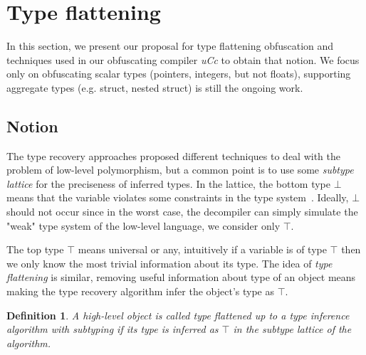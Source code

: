 \documentclass[compsoc,conference,a4paper,10pt,times]{IEEEtran}
\newtheorem{definition}{Definition}
\begin{document}
\section{Type flattening}
\noindent
In this section, we present our proposal for type flattening obfuscation and techniques used in
our obfuscating compiler \emph{uCc} to obtain that notion. We
focus only on obfuscating scalar types (pointers, integers, but not floats), supporting aggregate types
(e.g. struct, nested struct) is still the ongoing work.


\subsection{Notion}
\noindent
The type recovery approaches proposed different techniques to deal with the problem of
low-level polymorphism, but a common point
is to use some \emph{subtype lattice}
for the preciseness of inferred types. In the lattice, the bottom type $\bot$ means
that the variable violates some constraints in the type system~\cite{lee_tie_2011}.
Ideally, $\bot$ should not occur since in the worst case, the decompiler can simply
simulate the "weak" type system of the low-level language, we consider only $\top$.

The top type $\top$ means universal or any, intuitively if a variable is of type $\top$ then we only
know the most trivial information about its type.
The idea of \emph{type flattening} is similar, removing useful information about type
of an object means making the type recovery algorithm infer the object's type as $\top$.

\begin{definition}
  A high-level object is called type flattened up to a type inference algorithm with subtyping
  if its type is inferred as $\top$ in the subtype lattice of the algorithm.
\end{definition}
\end{document}
